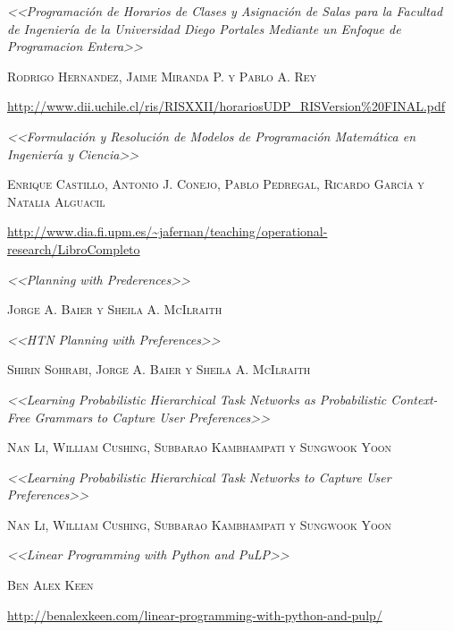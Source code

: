 \documentclass[a4paper]{article}
\begin{document}
\begin{thebibliography}{X}

 \textit{<<Programación de Horarios de Clases y Asignación de Salas para la Facultad de Ingeniería de la Universidad Diego Portales Mediante un Enfoque de Programacion Entera>>}

\textsc{Rodrigo Hernandez, Jaime Miranda P. y Pablo A. Rey}

\url{http://www.dii.uchile.cl/ris/RISXXII/horariosUDP_RISVersion%20FINAL.pdf}


 \textit{<<Formulación y Resolución de Modelos de Programación Matemática en Ingeniería y Ciencia>>}

\textsc{Enrique Castillo, Antonio J. Conejo, Pablo Pedregal, Ricardo García y Natalia Alguacil}

\url{http://www.dia.fi.upm.es/~jafernan/teaching/operational-research/LibroCompleto}


 \textit{<<Planning with Prederences>>}

\textsc{Jorge A. Baier y Sheila A. McIlraith}


 \textit{<<HTN Planning with Preferences>>}

\textsc{Shirin Sohrabi, Jorge A. Baier y Sheila A. McIlraith}


 \textit{<<Learning Probabilistic Hierarchical Task Networks as Probabilistic Context-Free Grammars to Capture User Preferences>>}

\textsc{Nan Li, William Cushing, Subbarao Kambhampati y Sungwook Yoon}


 \textit{<<Learning Probabilistic Hierarchical Task Networks to Capture User Preferences>>}

\textsc{Nan Li, William Cushing, Subbarao Kambhampati y Sungwook Yoon}


 \textit{<<Linear Programming with Python and PuLP>>}

\textsc{Ben Alex Keen}

\url{http://benalexkeen.com/linear-programming-with-python-and-pulp/}



\end{thebibliography}
\end{document}
